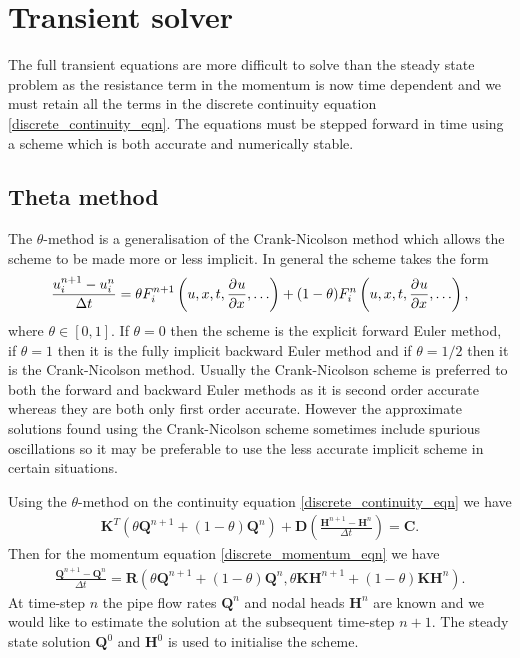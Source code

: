 \section{Transient solver} \label{sec:transient_solver}

The full transient equations are more difficult to solve than the steady state problem as the resistance term in the momentum is now time dependent and we must retain all the terms in the discrete continuity equation \eqref{discrete_continuity_eqn}. The equations must be stepped forward in time using a scheme which is both accurate and numerically stable. 

\subsection{Theta method}

The $\theta$-method is a generalisation of the Crank-Nicolson method which allows the scheme to be made more or less implicit. In general the scheme takes the form
\begin{align}
\frac{u_i^{n+1} - u_i^{n}}{\Delta t} = \theta F_i^{n+1}\left(u,x,t,\frac{\partial^{} u}{\partial x^{}},\ldots \right) + (1-\theta) F_i^{n}\left(u,x,t,\frac{\partial^{} u}{\partial x^{}},\ldots \right),
\end{align}
where $\theta \in [0,1]$. If $\theta = 0$ then the scheme is the explicit forward Euler method, if $\theta = 1$ then it is the fully implicit backward Euler method and if $\theta = 1/2$ then it is the Crank-Nicolson method. Usually the Crank-Nicolson scheme is preferred to both the forward and backward Euler methods as it is second order accurate whereas they are both only first order accurate. However the approximate solutions found using the Crank-Nicolson scheme sometimes include spurious oscillations so it may be preferable to use the less accurate implicit scheme in certain situations.


Using the $\theta$-method on the continuity equation \eqref{discrete_continuity_eqn} we have
\begin{align}
\mathbf{K}^T \left( \theta \mathbf{Q}^{n+1} + (1-\theta)\mathbf{Q}^{n} \right) + \mathbf{D} \left( \frac{\mathbf{H}^{n+1} - \mathbf{H}^{n}}{\Delta t} \right) = \mathbf{C}.
\end{align}
Then for the momentum equation \eqref{discrete_momentum_eqn} we have
\begin{align}
\frac{\mathbf{Q}^{n+1} - \mathbf{Q}^{n}}{\Delta t} = \mathbf{R}\left( \theta \mathbf{Q}^{n+1} + (1-\theta)\mathbf{Q}^{n}, \theta \mathbf{K} \mathbf{H}^{n+1} + (1-\theta) \mathbf{K} \mathbf{H}^n \right).
\end{align}
At time-step $n$ the pipe flow rates $\mathbf{Q}^{n}$ and nodal heads $\mathbf{H}^{n}$ are known and we would like to estimate the solution at the subsequent time-step $n+1$. The steady state solution $\mathbf{Q}^{0}$ and $\mathbf{H}^{0}$ is used to initialise the scheme.

